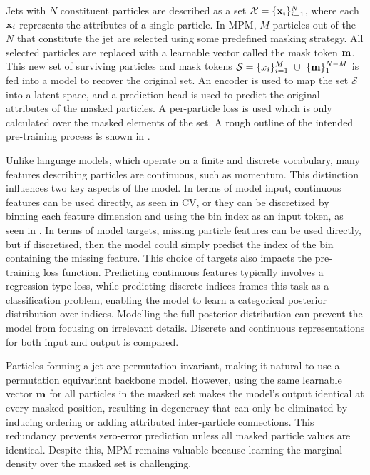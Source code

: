 Jets with $N$ constituent particles are described as a set $\mathcal{X}=\{\mathbf{x}_i\}_{i=1}^N$, where each $\mathbf{x}_i$ represents the attributes of a single particle.
In MPM, $M$ particles out of the $N$ that constitute the jet are selected using some predefined masking strategy.
All selected particles are replaced with a learnable vector called the mask token $\mathbf{m}$.
This new set of surviving particles and mask tokens $\mathcal{S}=\{x_i\}_{i=1}^M~\cup~\{\mathbf{m}\}_{1}^{N-M}$ is fed into a model to recover the original set.
An encoder is used to map the set $\mathcal{S}$ into a latent space, and a prediction head is used to predict the original attributes of the masked particles.
A per-particle loss is used which is only calculated over the masked elements of the set.
A rough outline of the intended pre-training process is shown in .

Unlike language models, which operate on a finite and discrete vocabulary, many features describing particles are continuous, such as momentum.
This distinction influences two key aspects of the model.
In terms of model input, continuous features can be used directly, as seen in CV, or they can be discretized by binning each feature dimension and using the bin index as an input token, as seen in \textcite{JetGPT}.
In terms of model targets, missing particle features can be used directly, but if discretised, then the model could simply predict the index of the bin containing the missing feature.
This choice of targets also impacts the pre-training loss function.
Predicting continuous features typically involves a regression-type loss, while predicting discrete indices frames this task as a classification problem, enabling the model to learn a categorical posterior distribution over indices.
Modelling the full posterior distribution can prevent the model from focusing on irrelevant details.
Discrete and continuous representations for both input and output is compared.

Particles forming a jet are permutation invariant, making it natural to use a permutation equivariant backbone model.
However, using the same learnable vector $\mathbf{m}$ for all particles in the masked set makes the model's output identical at every masked position, resulting in degeneracy that can only be eliminated by inducing ordering or adding attributed inter-particle connections.
This redundancy prevents zero-error prediction unless all masked particle values are identical.
Despite this, MPM remains valuable because learning the marginal density over the masked set is challenging.


